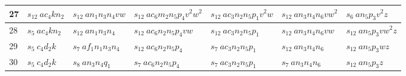 \documentclass[preliminary,copyright,creativecommons]{eptcs}
\theoremstyle{remark}
\begin{document}
\begin{table}[h]
\begin{center}
\begin{tabular}{ | l | l | l | l | l | l | l | }
27 & $s_{12}~ ac_4kn_2$ & $s_{12}~ an_1n_3n_4vw$ & $s_{12}~ ac_6m_2n_5p_4v^{2}w^{2}$ & $s_{12}~ ac_3n_2n_5p_1v^{2}w$ & $s_{12}~ an_3n_4n_6vw^{2}$ & $s_6~ an_5p_3v^{2}z$ \\ \hline
28 & $s_5~ ac_4kn_2$ & $s_{12}~ an_1n_3n_4$ & $s_{12}~ ac_6n_2n_5p_4vw$ & $s_{12}~ ac_3n_2n_5p_1$ & $s_{12}~ an_3n_4n_6vw$ & $s_{12}~ an_5p_3vw^{2}z$ \\ \hline
29 & $s_5~ c_4d_2k$ & $s_7~ af_1n_1n_3n_4$ & $s_{12}~ ac_6n_2n_5p_4$ & $s_7~ ac_3n_2n_5p_1$ & $s_{12}~ an_3n_4n_6$ & $s_{12}~ an_5p_3wz$ \\ \hline
30 & $s_5~ c_4d_2k$ & $s_8~ an_3n_4q_1$ & $s_7~ ac_6n_2n_5p_4$ & $s_7~ ac_3n_2n_5p_1$ & $s_7~ an_3n_4n_6$ & $s_{12}~ an_5p_3z$ \\ \hline
\end{tabular}
\end{center}
\end{table}
\end{document}
